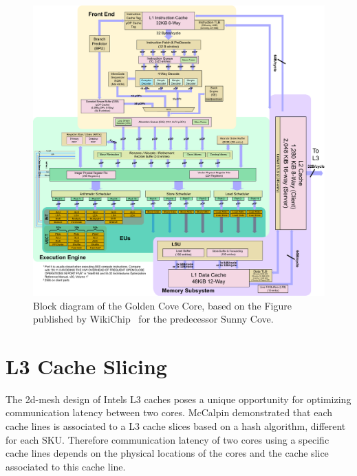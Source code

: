 \begin{figure}[]
    \centering
    \includegraphics[width=\columnwidth]{fig/GoldenCoveCore.pdf}
    \caption{\label{fig:golden-cove}Block diagram of the Golden Cove Core, based on the Figure published by WikiChip~\cite{Wikichip_SunnyCoveDiagram} for the predecessor Sunny Cove.}
\end{figure}

\clearpage

\section{L3 Cache Slicing}

The 2d-mesh design of Intels L3 caches poses a unique opportunity for optimizing communication latency between two cores.
McCalpin demonstrated that each cache lines is associated to a L3 cache slices based on a hash algorithm, different for each SKU.
Therefore communication latency of two cores using a specific cache lines depends on the physical locations of the cores and the cache slice associated to this cache line.

